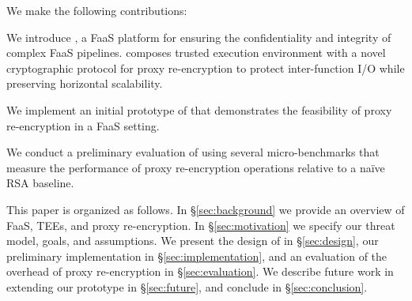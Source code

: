 


%
We make the following contributions:
%
\begin{widelist}
\item We introduce \SystemName, a FaaS platform for ensuring the
    confidentiality and integrity of complex FaaS pipelines.
    \SystemName composes trusted execution environment with a novel
    cryptographic protocol for proxy re-encryption to protect inter-function
    I/O while preserving horizontal scalability.

\item We implement an initial prototype of \SystemName that demonstrates the
    feasibility of proxy re-encryption in a FaaS setting.

\item We conduct a preliminary evaluation of \SystemName using several
    micro-benchmarks that measure the performance of proxy re-encryption 
    operations relative to a na\"{i}ve RSA baseline.
\end{widelist}


%
This paper is organized as follows.
%
In \S\ref{sec:background} we provide an overview of FaaS, TEEs, and proxy
re-encryption.
%
In \S\ref{sec:motivation} we specify our threat model, goals, and assumptions.
%
We present the design of \SystemName in \S\ref{sec:design}, our preliminary
implementation in \S\ref{sec:implementation}, and an evaluation of the overhead
of proxy re-encryption in \S\ref{sec:evaluation}.
%
We describe future work in extending our prototype in \S\ref{sec:future}, and
conclude in \S\ref{sec:conclusion}.
